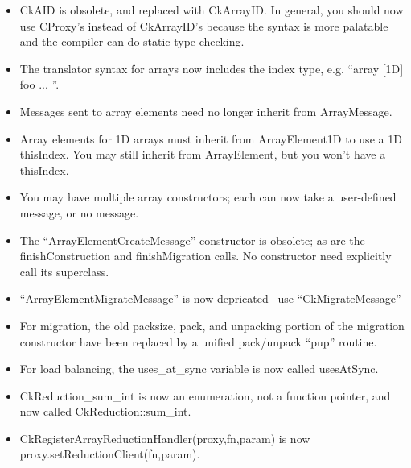 \begin{itemize}

\item CkAID is obsolete, and replaced with CkArrayID.  In general,
you should now use CProxy's instead of CkArrayID's because the syntax
is more palatable and the compiler can do static type checking.

\item The translator syntax for arrays now includes the index type,
e.g. ``array [1D] foo { ... }''.

\item Messages sent to array elements need no longer inherit from 
ArrayMessage.

\item Array elements for 1D arrays must inherit from ArrayElement1D
to use a 1D thisIndex.  You may still inherit from ArrayElement, but you
won't have a thisIndex.

\item You may have multiple array constructors; each can now take a user-defined message, or no message.  

\item The ``ArrayElementCreateMessage'' constructor is obsolete;
as are the finishConstruction and finishMigration calls. No constructor
need explicitly call its superclass.  

\item ``ArrayElementMigrateMessage'' is now depricated-- use 
``CkMigrateMessage''

\item For migration, the old packsize, pack, and unpacking portion of
the migration constructor have been replaced by a unified pack/unpack 
``pup'' routine.

\item For load balancing, the uses\_at\_sync variable is now called usesAtSync.

\item CkReduction\_sum\_int is now an enumeration, not a function pointer, and
now called CkReduction::sum\_int.

\item CkRegisterArrayReductionHandler(proxy,fn,param)
is now proxy.setReductionClient(fn,param).
\end{itemize}



